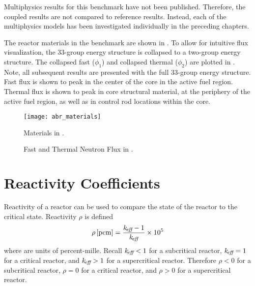   Multiphysics results for this benchmark have not been published. Therefore,
  the coupled results are not compared to reference results. Instead, each of
  the multiphysics models has been investigated individually in the preceding
  chapters. 

  The reactor materials in the benchmark are shown in . 
  To allow for intuitive flux visualization, the 33-group energy structure is
  collapsed to a two-group energy structure. The collapsed fast ($\phi_1$) and
  collapsed thermal ($\phi_2$) are plotted in .
  Note, all subsequent results are presented with the full 33-group energy
  structure. Fast flux is shown to peak in
  the center of the core in the active fuel region. Thermal flux is shown to
  peak in core structural material, at the periphery of the active fuel region,
  as well as in control rod locations within the core.

  \begin{figure}
    \centering
    \texttt{[image: abr\_materials]}
    \caption{Materials in .}
    \label{fig:abr_materials}
  \end{figure}

  \begin{figure}
    \centering
    \hspace{0.2in}
    \caption{Fast and Thermal Neutron Flux in .}
    \label{fig:abr_fluxes}
  \end{figure}

\section{Reactivity Coefficients}
\label{sec:reactivity_coefficients}
  Reactivity of a reactor can be used to compare the state of the reactor to the
  critical state. Reactivity $\rho$ is defined
  \begin{equation}
    \label{eq:reactivity}
    \rho \left[\text{{pcm}}\right] = \frac{k_{\!\mbox{\scriptsize \em eff}}-1}{k_{\!\mbox{\scriptsize \em eff}}} \times 10^5
  \end{equation}
  where  are units of percent-mille.
  Recall $k_{\!\mbox{\scriptsize \em eff}} < 1$ for a subcritical reactor, $k_{\!\mbox{\scriptsize \em eff}}=1$ for a critical
  reactor, and $k_{\!\mbox{\scriptsize \em eff}} > 1$ for a supercritical reactor. Therefore $\rho < 0$
  for a subcritical reactor, $\rho = 0$ for a critical reactor, and $\rho > 0$
  for a supercritical reactor. 

